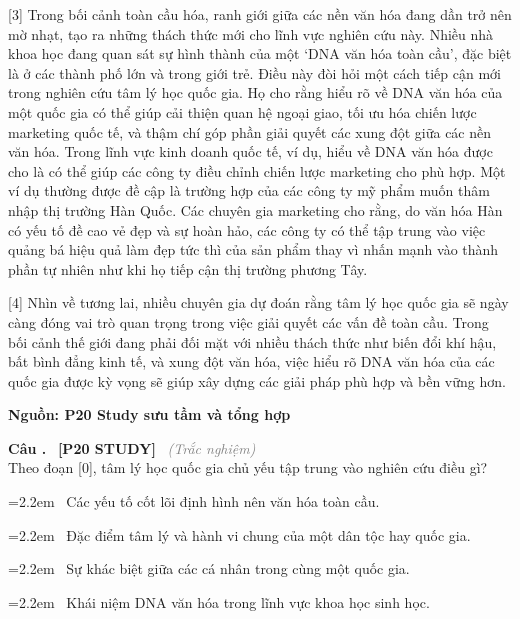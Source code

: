 \documentclass[12pt,a4paper,twoside]{article}
\newcounter{qcounter}
\newcommand{\question}[2][]{%
    \stepcounter{qcounter}%
    \par\vspace{5pt}%
    \noindent\textcolor{primaryBlue}{\textbf{Câu \theqcounter.}}~%
    \textcolor{secondaryBlue}{\small\textbf{[P20 STUDY]}}~%
    \if\relax\detokenize{#1}\relax\else\textcolor{gray}{\small\textit{(#1)}}~\fi\\[1pt]
    \noindent #2%
}
\newcommand{\choiceitem}[2]{%
    \tikz[baseline=-0.5ex]{
        \node[draw=primaryBlue, circle, minimum size=1.5em, inner sep=0pt, thick] {\textbf{#1}};
    }~#2%
}
\newenvironment{readingpassage}[1][]{%
    \begin{tcolorbox}[enhanced, colback=grayLight, colframe=secondaryBlue,
        coltitle=textDark, fonttitle=\bfseries, title={#1},
        rounded corners, arc=3mm, boxrule=1pt,
        left=15pt, right=15pt, top=10pt, bottom=10pt,
        breakable, before skip=10pt, after skip=10pt, drop fuzzy shadow]
    \setstretch{1.3}
}{\end{tcolorbox}}
\begin{document}
\begin{readingpassage}[]
[3] Trong bối cảnh toàn cầu hóa, ranh giới giữa các nền văn hóa đang dần trở nên mờ nhạt, tạo ra những thách thức mới cho lĩnh vực nghiên cứu này. Nhiều nhà khoa học đang quan sát sự hình thành của một `DNA văn hóa toàn cầu', đặc biệt là ở các thành phố lớn và trong giới trẻ. Điều này đòi hỏi một cách tiếp cận mới trong nghiên cứu tâm lý học quốc gia. Họ cho rằng hiểu rõ về DNA văn hóa của một quốc gia có thể giúp cải thiện quan hệ ngoại giao, tối ưu hóa chiến lược marketing quốc tế, và thậm chí góp phần giải quyết các xung đột giữa các nền văn hóa. Trong lĩnh vực kinh doanh quốc tế, ví dụ, hiểu về DNA văn hóa được cho là có thể giúp các công ty điều chỉnh chiến lược marketing cho phù hợp. Một ví dụ thường được đề cập là trường hợp của các công ty mỹ phẩm muốn thâm nhập thị trường Hàn Quốc. Các chuyên gia marketing cho rằng, do văn hóa Hàn có yếu tố đề cao vẻ đẹp và sự hoàn hảo, các công ty có thể tập trung vào việc quảng bá hiệu quả làm đẹp tức thì của sản phẩm thay vì nhấn mạnh vào thành phần tự nhiên như khi họ tiếp cận thị trường phương Tây.

[4] Nhìn về tương lai, nhiều chuyên gia dự đoán rằng tâm lý học quốc gia sẽ ngày càng đóng vai trò quan trọng trong việc giải quyết các vấn đề toàn cầu. Trong bối cảnh thế giới đang phải đối mặt với nhiều thách thức như biến đổi khí hậu, bất bình đẳng kinh tế, và xung đột văn hóa, việc hiểu rõ DNA văn hóa của các quốc gia được kỳ vọng sẽ giúp xây dựng các giải pháp phù hợp và bền vững hơn.

\hfill \textbf{Nguồn: P20 Study sưu tầm và tổng hợp}
\end{readingpassage}

\setcounter{qcounter}{0}
\question[Trắc nghiệm]{Theo đoạn [0], tâm lý học quốc gia chủ yếu tập trung vào nghiên cứu điều gì?}
\par\vspace{4pt}
\noindent\hangindent=2.2em\choiceitem{A}{Các yếu tố cốt lõi định hình nên văn hóa toàn cầu.}\par\vspace{4pt}
\noindent\hangindent=2.2em\choiceitem{B}{Đặc điểm tâm lý và hành vi chung của một dân tộc hay quốc gia.}\par\vspace{4pt}
\noindent\hangindent=2.2em\choiceitem{C}{Sự khác biệt giữa các cá nhân trong cùng một quốc gia.}\par\vspace{4pt}
\noindent\hangindent=2.2em\choiceitem{D}{Khái niệm DNA văn hóa trong lĩnh vực khoa học sinh học.}\par\vspace{4pt}
\end{document}
